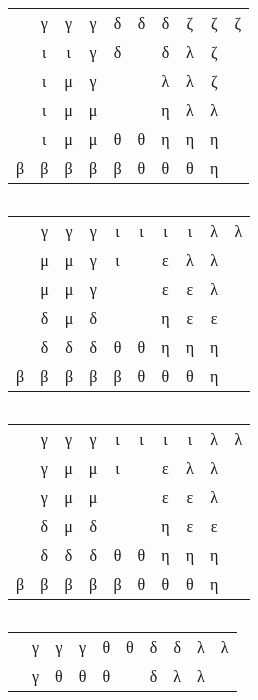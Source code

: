 \begin{margintable}%
\inputminted[fontsize=\footnotesize,]{python}{backtracking/pentominoes-regular-snippet.py}
{
\setlength{\tabcolsep}{4pt}
$\quad$\\
\begin{tabular}{|cccccccccc|}
\hline
  & γ & γ & γ & δ & δ & δ & ζ & ζ & ζ \\
  & ι & ι & γ & δ &   & δ & λ & ζ & \\
  & ι & μ & γ &   &   & λ & λ & ζ & \\
  & ι & μ & μ &   &   & η & λ & λ & \\
  & ι & μ & μ & θ & θ & η & η & η & \\
β & β & β & β & β & θ & θ & θ & η & \\
\hline
\end{tabular}
$\quad$\\
$\quad$\\
\begin{tabular}{|cccccccccc|}
\hline
  & γ & γ & γ & ι & ι & ι & ι & λ & λ \\
  & μ & μ & γ & ι &   & ε & λ & λ & \\
  & μ & μ & γ &   &   & ε & ε & λ & \\
  & δ & μ & δ &   &   & η & ε & ε & \\
  & δ & δ & δ & θ & θ & η & η & η & \\
β & β & β & β & β & θ & θ & θ & η & \\
\hline
\end{tabular}
$\quad$\\
$\quad$\\
\begin{tabular}{|cccccccccc|}
\hline
  & γ & γ & γ & ι & ι & ι & ι & λ & λ \\
  & γ & μ & μ & ι &   & ε & λ & λ & \\
  & γ & μ & μ &   &   & ε & ε & λ & \\
  & δ & μ & δ &   &   & η & ε & ε & \\
  & δ & δ & δ & θ & θ & η & η & η & \\
β & β & β & β & β & θ & θ & θ & η & \\
\hline
\end{tabular}
$\quad$\\
$\quad$\\
\begin{tabular}{|cccccccccc|}
\hline
  & γ & γ & γ & θ & θ & δ & δ & λ & λ \\
  & γ & θ & θ & θ &   & δ & λ & λ & \\

\end{tabular}}
\end{margintable}
